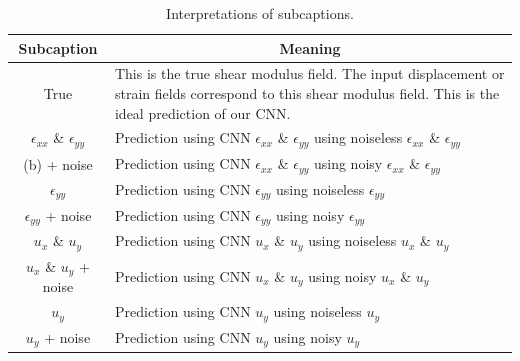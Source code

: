 \documentclass[12pt]{article}
\begin{document}
\begin{table}
  \centering
   \begin{tabular}{cp{8cm}}
    \hline
    \multicolumn{1}{|c|}{Subcaption} & \multicolumn{1}{c|}{Meaning}\\
    \hline
    \multicolumn{1}{|c|}{True} & \multicolumn{1}{p{8cm}|}{This is the true shear modulus field. The input displacement or strain fields correspond to this shear modulus field. This is the ideal prediction of our CNN.}\\
    \hline
    \multicolumn{1}{|c|}{$\epsilon_{xx}$ \& $\epsilon_{yy}$} & \multicolumn{1}{p{8cm}|}{Prediction using CNN $\epsilon_{xx}$ \& $\epsilon_{yy}$ using noiseless $\epsilon_{xx}$ \& $\epsilon_{yy}$}\\
    \hline
    \multicolumn{1}{|c|}{(b) + noise} & \multicolumn{1}{p{8cm}|}{Prediction using CNN $\epsilon_{xx}$ \& $\epsilon_{yy}$ using noisy $\epsilon_{xx}$ \& $\epsilon_{yy}$}\\
    \hline
    \multicolumn{1}{|c|}{$\epsilon_{yy}$} & \multicolumn{1}{p{8cm}|}{Prediction using CNN $\epsilon_{yy}$ using noiseless $\epsilon_{yy}$}\\
    \hline
    \multicolumn{1}{|c|}{$\epsilon_{yy}$ + noise} & \multicolumn{1}{p{8cm}|}{Prediction using CNN $\epsilon_{yy}$ using noisy $\epsilon_{yy}$}\\
    \hline
    \multicolumn{1}{|c|}{$u_x$ \& $u_y$} & \multicolumn{1}{p{8cm}|}{Prediction using CNN $u_x$ \& $u_y$  using noiseless $u_x$ \& $u_y$ }\\
    \hline
    \multicolumn{1}{|c|}{$u_x$ \& $u_y$ + noise} & \multicolumn{1}{p{8cm}|}{Prediction using CNN $u_x$ \& $u_y$  using noisy $u_x$ \& $u_y$ }\\
    \hline
    \multicolumn{1}{|c|}{$u_y$} & \multicolumn{1}{p{8cm}|}{Prediction using CNN $u_y$  using noiseless $u_y$ }\\
    \hline
    \multicolumn{1}{|c|}{$u_y$ + noise} & \multicolumn{1}{p{8cm}|}{Prediction using CNN $u_y$  using noisy $u_y$ }\\
    \hline
  \end{tabular}
  \caption{\label{tab:subcap} Interpretations of subcaptions.}
\end{table}
%
\end{document}
